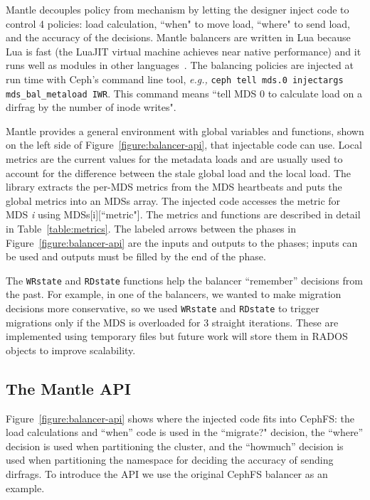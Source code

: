 Mantle decouples policy from mechanism by letting the designer inject code to control 4 policies: load calculation, ``when" to move load, ``where" to send load, and the accuracy of the decisions. Mantle balancers are written in Lua because Lua is fast (the LuaJIT virtual machine achieves near native performance) and it runs well as modules in other languages~\cite{grawinkel:pdsw2012-lua}. The balancing policies are injected at run time with Ceph's command line tool, {\it e.g.,} \texttt{\small ceph tell mds.0 injectargs mds\_bal\_metaload IWR}. This command means ``tell MDS 0 to calculate load on a dirfrag by the number of inode writes".

Mantle provides a general environment with global variables and functions, shown on the left side of Figure~\ref{figure:balancer-api}, that injectable code can use. Local metrics are the current values for the metadata loads and are usually used to account for the difference between the stale global load and the local load. The library extracts the per-MDS metrics from the MDS heartbeats and puts the global metrics into an MDSs array. The injected code accesses the metric for MDS {\it i} using MDSs[i][``metric"]. The metrics and functions are described in detail in Table~\ref{table:metrics}. The labeled arrows between the phases in Figure~\ref{figure:balancer-api} are the inputs and outputs to the phases; inputs can be used and outputs must be filled by the end of the phase.

The \texttt{WRstate} and \texttt{RDstate} functions help the balancer ``remember'' decisions from the past. For example, in one of the balancers, we wanted to make migration decisions more conservative, so we used \texttt{WRstate} and \texttt{RDstate} to trigger migrations only if the MDS is overloaded for 3 straight iterations. These are implemented using temporary files but future work will store them in RADOS objects to improve scalability.

\subsection{The Mantle API}
\label{the-mantle-api}
Figure~\ref{figure:balancer-api} shows where the injected code fits into CephFS: the load calculations and ``when'' code is used in the ``migrate?" decision, the ``where'' decision is used when partitioning the cluster, and the ``howmuch'' decision is used when partitioning the namespace for deciding the accuracy of sending dirfrags. To introduce the API we use the original CephFS balancer as an example. 

